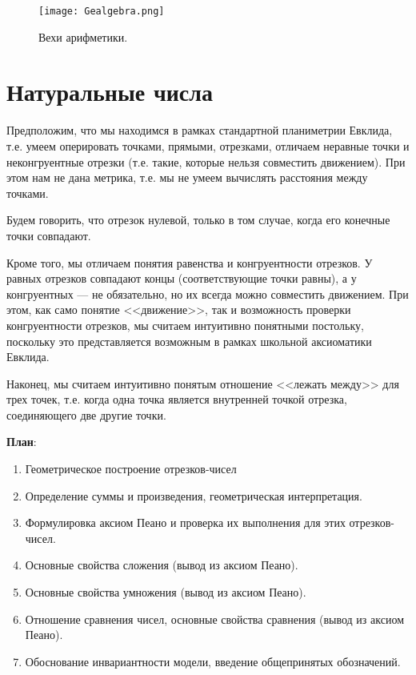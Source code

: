 
\begin{figure}[htb!]
\begin{center}
\texttt{[image: Gealgebra.png]}
\end{center}
\caption{Вехи арифметики.}\label{ariphmetics}
\end{figure}



\section{Натуральные числа}


Предположим, что мы находимся в рамках стандартной планиметрии Евклида, т.е. умеем оперировать точками, прямыми, отрезками, отличаем неравные точки и неконгруентные отрезки (т.е. такие, которые нельзя совместить движением). При этом нам не дана метрика, т.е. мы не умеем вычислять расстояния между точками.

Будем говорить, что отрезок нулевой, только в том случае, когда его конечные точки совпадают.

Кроме того, мы отличаем понятия равенства и конгруентности отрезков. У равных отрезков совпадают концы (соответствующие точки равны), а у конгруентных --- не обязательно, но их всегда можно совместить движением. При этом, как само понятие <<движение>>, так и возможность проверки конгруентности отрезков, мы считаем интуитивно понятными постольку, поскольку это представляется возможным в рамках школьной аксиоматики Евклида.

Наконец, мы считаем интуитивно понятым отношение <<лежать между>> для трех точек, т.е. когда одна точка является внутренней точкой отрезка, соединяющего две другие точки.

\textbf{План}:
\begin{enumerate}
\item Геометрическое построение отрезков-чисел
\item Определение суммы и произведения, геометрическая интерпретация.
\item Формулировка аксиом Пеано и проверка их выполнения для этих отрезков-чисел.
\item Основные свойства сложения (вывод из аксиом Пеано).
\item Основные свойства умножения (вывод из аксиом Пеано).
\item Отношение сравнения чисел, основные свойства сравнения (вывод из аксиом Пеано).
\item Обоснование инвариантности модели, введение общепринятых обозначений.
\end{enumerate}


